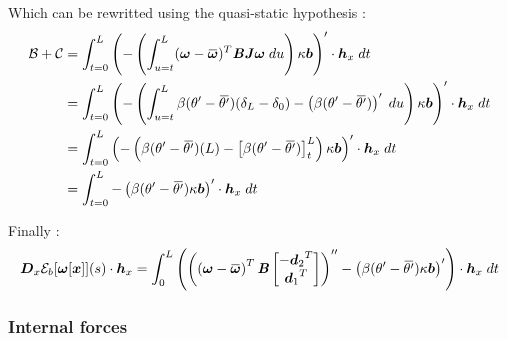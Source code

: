 Which can be rewritted using the quasi-static hypothesis :
\begin{equation}
	\begin{aligned} 
	\mathcal{B}+\mathcal{C} 
	&=
	\int_{t=0}^{L} \left(
	-\left(\int_{u=t}^{L}(\vect{\omega} - \overbar{\vect{\omega}})^T \mat{B}\mat{J}\vect{\omega}\;du\right)
	\kappa\vect{b}
	\right)'\cdot \vect{h}_x \;dt\\
	&=
	\int_{t=0}^{L} \left(
	-\left(
	\int_{u=t}^{L}\beta(\theta' -{\overbar{\theta'}})(\delta_L-\delta_0) - \left(\beta(\theta' -{\overbar{\theta'}})\right)'\;du
	\right)
	\kappa\vect{b}
	\right)'\cdot \vect{h}_x \;dt\\
	&=
	\int_{t=0}^{L} \left(
	-\left(
	\beta(\theta' -{\overbar{\theta'}})(L) - \left[\beta(\theta' -{\overbar{\theta'}})\right]_t^L
	\right)
	\kappa\vect{b}
	\right)'\cdot \vect{h}_x \;dt\\
		&=
	\int_{t=0}^{L} -\left(
	\beta(\theta' -{\overbar{\theta'}})
	\kappa\vect{b}
	\right)'\cdot \vect{h}_x \;dt\\
	\end{aligned} 
\end{equation}

Finally :
\begin{equation}
		\pdiffof{x}{\mathcal{E}_b[\vect{\omega}[\vect{x}]]}{s}{\vect{h}_x}
		=
		\int_{0}^{L} \left(
		\left(\left(\vect{\omega} - \overbar{\vect{\omega}}\right)^T \mat{B} 
		\begin{bmatrix}
			-{\vect{d}_2}^T\\
			{\vect{d}_1}^T\\
		\end{bmatrix}\right)''
		-
		\left(\beta(\theta' -{\overbar{\theta'}})
		\kappa\vect{b}\right)'
		\right)\cdot \vect{h}_x \;dt\\
\end{equation}

\subsubsection{Internal forces}




